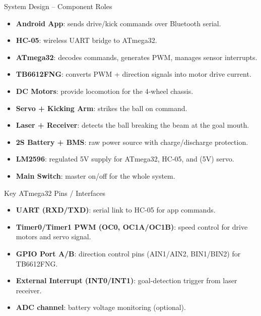\documentclass[aspectratio=169]{beamer}
\begin{document}
\begin{frame}{System Design -- Component Roles}
  \begin{itemize}
    \item \textbf{Android App}: sends drive/kick commands over Bluetooth serial.
    \item \textbf{HC-05}: wireless UART bridge to ATmega32.
    \item \textbf{ATmega32}: decodes commands, generates PWM, manages sensor interrupts.
    \item \textbf{TB6612FNG}: converts PWM + direction signals into motor drive current.
    \item \textbf{DC Motors}: provide locomotion for the 4-wheel chassis.
    \item \textbf{Servo + Kicking Arm}: strikes the ball on command.
    \item \textbf{Laser + Receiver}: detects the ball breaking the beam at the goal mouth.
    \item \textbf{2S Battery + BMS}: raw power source with charge/discharge protection.
    \item \textbf{LM2596}: regulated 5V supply for ATmega32, HC-05, and (5V) servo.
    \item \textbf{Main Switch}: master on/off for the whole system.
  \end{itemize}
\end{frame}

\begin{frame}{Key ATmega32 Pins / Interfaces}
  \begin{itemize}
    \item \textbf{UART (RXD/TXD)}: serial link to HC-05 for app commands.
    \item \textbf{Timer0/Timer1 PWM (OC0, OC1A/OC1B)}: speed control for drive motors and servo signal.
    \item \textbf{GPIO Port A/B}: direction control pins (AIN1/AIN2, BIN1/BIN2) for TB6612FNG.
    \item \textbf{External Interrupt (INT0/INT1)}: goal-detection trigger from laser receiver.
    \item \textbf{ADC channel}: battery voltage monitoring (optional).
  \end{itemize}
\end{frame}
\end{document}
